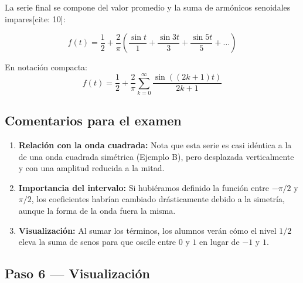 \documentclass[
  letterpaper,
  DIV=11,
  numbers=noendperiod]{scrreprt}
\providecommand{\tightlist}{%
  \setlength{\itemsep}{0pt}\setlength{\parskip}{0pt}}
\begin{document}
La serie final se compone del valor promedio y la suma de armónicos
senoidales impares{[}cite: 10{]}:

\[
\boxed{f(t) = \frac{1}{2} + \frac{2}{\pi} \left( \frac{\sin t}{1} + \frac{\sin 3t}{3} + \frac{\sin 5t}{5} + \dots \right)}
\]

En notación compacta:
\[f(t) = \frac{1}{2} + \frac{2}{\pi} \sum_{k=0}^{\infty} \frac{\sin((2k+1)t)}{2k+1}\]

\subsection{Comentarios para el
examen}\label{comentarios-para-el-examen}

\begin{enumerate}
\def\labelenumi{\arabic{enumi}.}
\tightlist
\item
  \textbf{Relación con la onda cuadrada:} Nota que esta serie es casi
  idéntica a la de una onda cuadrada simétrica (Ejemplo B), pero
  desplazada verticalmente y con una amplitud reducida a la mitad.
\item
  \textbf{Importancia del intervalo:} Si hubiéramos definido la función
  entre \(-\pi/2\) y \(\pi/2\), los coeficientes habrían cambiado
  drásticamente debido a la simetría, aunque la forma de la onda fuera
  la misma.
\item
  \textbf{Visualización:} Al sumar los términos, los alumnos verán cómo
  el nivel \(1/2\) eleva la suma de senos para que oscile entre \(0\) y
  \(1\) en lugar de \(-1\) y \(1\).
\end{enumerate}

\subsection{Paso 6 --- Visualización}\label{paso-6-visualizaciuxf3n}
\end{document}

